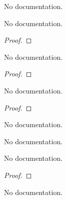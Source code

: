 
\begin{definition}\label{H}
        \leanok
                No documentation.
    \end{definition}

\begin{theorem}\label{Ex1
--}
        \leanok
                No documentation.
    \end{theorem}

\begin{proof}
    \leanok
\end{proof}

\begin{theorem}\label{Ex2
--}
        \leanok
                No documentation.
    \end{theorem}

\begin{proof}
    \leanok
\end{proof}

\begin{theorem}\label{Ex3}
        \leanok
                No documentation.
    \end{theorem}

\begin{proof}
    \leanok
\end{proof}

\begin{definition}\label{HK}
        \leanok
                No documentation.
    \end{definition}

\begin{definition}\label{subgroupHK}
        \leanok
                No documentation.
    \end{definition}

\begin{theorem}\label{Ex5}
        \leanok
                No documentation.
    \end{theorem}

\begin{proof}
    \leanok
\end{proof}

\begin{definition}\label{S}
        \leanok
                No documentation.
    \end{definition}

